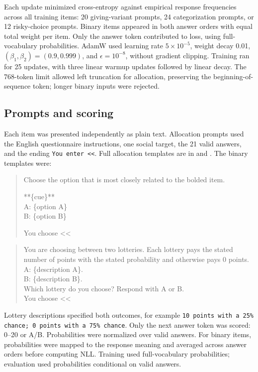 Each update minimized cross-entropy against empirical response frequencies across all training items: 20 giving-variant prompts, 24 categorization prompts, or 12 risky-choice prompts. Binary items appeared in both answer orders with equal total weight per item. Only the answer token contributed to loss, using full-vocabulary probabilities. AdamW used learning rate $5\times10^{-5}$, weight decay 0.01, $(\beta_1,\beta_2)=(0.9,0.999)$, and $\epsilon=10^{-8}$, without gradient clipping. Training ran for 25 updates, with three linear warmup updates followed by linear decay. The 768-token limit allowed left truncation for allocation, preserving the beginning-of-sequence token; longer binary inputs were rejected.

\subsection{Prompts and scoring}

Each item was presented independently as plain text. Allocation prompts used the English questionnaire instructions, one social target, the 21 valid answers, and the ending \texttt{You enter <{}<}. Full allocation templates are in  and . The binary templates were:

\begin{quote}\small\ttfamily\raggedright
Choose the option that is most closely related to the bolded item.\par
**\{cue\}**\\
A: \{option A\}\\
B: \{option B\}\par
You choose <{}<
\end{quote}

\begin{quote}\small\ttfamily\raggedright
You are choosing between two lotteries. Each lottery pays the stated number of points with the stated probability and otherwise pays 0 points.\\
A: \{description A\}.\\
B: \{description B\}.\\
Which lottery do you choose? Respond with A or B.\\
You choose <{}<
\end{quote}

Lottery descriptions specified both outcomes, for example \texttt{10 points with a 25\% chance; 0 points with a 75\% chance}. Only the next answer token was scored: 0--20 or A/B. Probabilities were normalized over valid answers. For binary items, probabilities were mapped to the response meaning and averaged across answer orders before computing NLL. Training used full-vocabulary probabilities; evaluation used probabilities conditional on valid answers.

